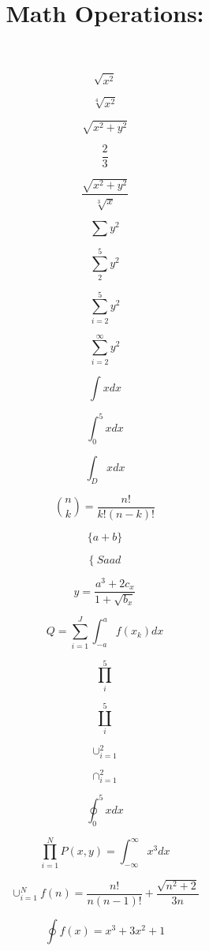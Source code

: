 \documentclass[10pt]{article}
\begin{document}
\title{Math Operations:}
\maketitle

$$\sqrt{x^2}$$

$$\sqrt[4]{x^2}$$

$$\sqrt{x^2+y^2}$$

$$\frac{2}{3}$$

$$\frac{\sqrt{x^2+y^2}}{\sqrt[3]{x}}$$

$$\sum y^2$$

$$\sum_2^5 y^2$$

$$\sum_{i=2}^5 y^2$$

$$\sum_{i=2}^\infty y^2$$

$$\int x dx$$

$$\int_0^5 x dx$$

$$\int_D x dx$$


$$\binom{n}{k} = \frac{n!}{k!(n-k)!}$$

$$\{a+b\}$$ %

$$\{\ Saad$$

$$ y=\frac{a^3+2c_x}{1+\sqrt{b_x}}$$

$$Q=\sum_{i=1}^J \int_{-a}^a f(x_k) dx $$

$$\prod_i^5$$

$$\coprod_i^5$$

$$\cup_{i=1}^2$$

$$\cap_{i=1}^2$$

$$\oint_0^5 x dx$$

$$\prod_{i=1}^N P(x,y) = \int_{-\infty}^{\infty} x^3 dx $$

$$ \cup_{i=1}^N f(n)=\frac{n!}{n(n-1)!}+ \frac{\sqrt{n^2+2}}{3n} $$

$$ \oint f(x)=x^3+3x^2+1 $$
\end{document}
